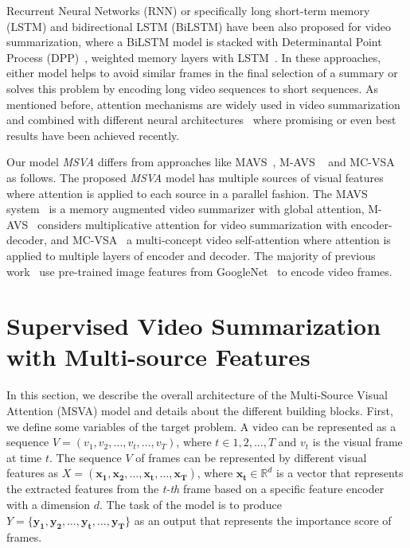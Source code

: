 \documentclass{article}
\begin{document}
Recurrent Neural Networks (RNN) or specifically long short-term memory (LSTM) and bidirectional LSTM (BiLSTM) have been also proposed for video summarization, where a BiLSTM model is stacked with Determinantal Point Process (DPP)~\cite{DBLP:conf/eccv/ZhangCSG16}, weighted memory layers with LSTM~\cite{DBLP:conf/eccv/ZhangGS18}.
In these approaches, either model helps to avoid similar frames in the final selection of a summary or solves this problem by encoding long video sequences to short sequences. As mentioned before, attention mechanisms are widely used in video summarization and combined with different neural architectures~\cite{DBLP:journals/corr/abs-2006-01410, DBLP:conf/accv/FajtlSAMR18,DBLP:journals/corr/abs-1708-09545,DBLP:conf/wacv/FuTC19} where promising or even best results have been achieved recently.

Our model \emph{MSVA} differs from approaches like MAVS~\cite{DBLP:conf/mm/FengLKZ18}, M-AVS ~\cite{DBLP:journals/corr/abs-1708-09545} and MC-VSA ~\cite{DBLP:journals/corr/abs-2006-01410} as follows. The proposed \emph{MSVA} model has multiple sources of visual features where attention is applied to each source in a parallel fashion. The MAVS system~\cite{DBLP:conf/mm/FengLKZ18} is a memory augmented video summarizer with global attention, M-AVS~\cite{DBLP:journals/corr/abs-1708-09545} considers multiplicative attention for video summarization with encoder-decoder, and MC-VSA~\cite{DBLP:journals/corr/abs-2006-01410} a multi-concept video self-attention where attention is applied to multiple layers of encoder and decoder. 
The majority of previous work~\cite{DBLP:conf/eccv/ZhangCSG16, DBLP:conf/eccv/ZhangGS18, DBLP:journals/corr/abs-1708-09545} use pre-trained image features from GoogleNet~\cite{DBLP:conf/cvpr/SzegedyLJSRAEVR15} to encode video frames.




\section{Supervised Video Summarization with Multi-source Features}\label{sec:methodology}

In this section, we describe the overall architecture of the Multi-Source Visual Attention (MSVA) model and details about the different building blocks. 
First, we define some variables of the target problem. A video can be represented as a sequence $V=\left(v_1,v_2,\ldots,v_t,\ldots,v_T\right)$, where $t \in {1,2,\dots,T}$ and $v_t$ is the visual frame at time $t$. 
The sequence $V$ of frames can be represented by different visual features as $X=\left(\mathbf{x_1},\mathbf{x_2},\ldots,\mathbf{x_t},\ldots,\mathbf{x_T}\right)$, where $\mathbf{x_t}  \in \mathbb{R}^{d}$ is a vector that represents the extracted features from the \emph{t-th} frame based on a specific feature encoder with a dimension $d$. The task of the model is to produce $Y=\{\mathbf{y_1},\mathbf{y_2},\ldots,\mathbf{y_t},\ldots,\mathbf{y_T}\}$ as an output that represents the importance score of frames.
																																																																																																																																																							  
\end{document}

